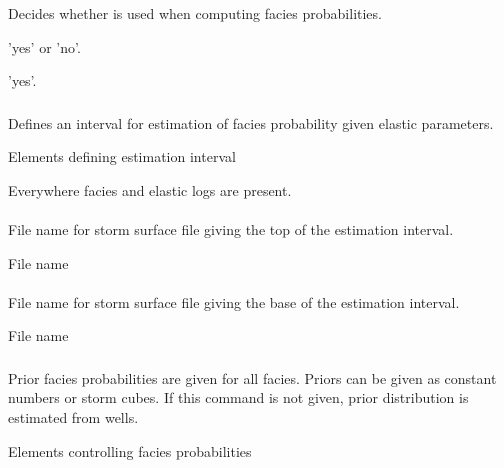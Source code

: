 \subsubsection{}
\slist
  \item \Description Decides whether \vs is used when computing facies probabilities.
  \item \Argument'yes' or 'no'.
  \item \Default 'yes'.
\elist

\subsubsection{}
 \slist
   \item \Description Defines an interval for estimation of facies probability given elastic parameters.
   \item \Argument Elements defining estimation interval
   \item \Default Everywhere facies and elastic logs are present.
 \elist

\paragraph{}
 \slist
   \item \Description File name for storm surface file giving the top of the estimation interval.
   \item \Argument File name
   \item \Default
 \elist

\paragraph{}
 \slist
   \item \Description File name for storm surface file giving the base of the estimation interval.
   \item \Argument File name
   \item \Default
 \elist

\subsubsection{}
 \slist
   \item \Description Prior facies probabilities are given for all facies. Priors can be given as constant numbers or storm cubes. If this command is not given, prior distribution is estimated from wells.
   \item \Argument Elements controlling facies probabilities
   \item \Default
 \elist

